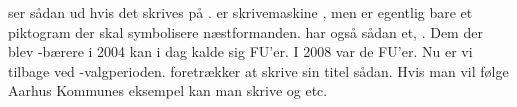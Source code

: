 \TKET ser sådan ud hvis det skrives på \RemToR. \RemToR er \TKETs
skrivemaskine \ikonNF, men \ikonNF er egentlig bare et piktogram der
skal symbolisere næstformanden. \KASS har også sådan et, \ikonKASS.
Dem der blev \ikonFU-bærere i 2004 kan i dag kalde sig
FU'er. I 2008 var de
FU'er. Nu er vi
tilbage ved \TKgetgf-valgperioden. \KASS foretrækker
at skrive sin titel sådan. Hvis man vil følge Aarhus Kommunes eksempel
kan man skrive \TKAA og \TKETsAA etc.
